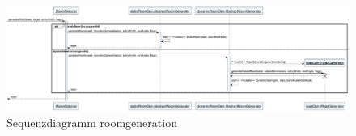 \begin{figure} [htbp]
    \centering
    \centering
    \includegraphics[width=\linewidth]{./Generierung/Bilder/roomGenerationSequenz.png}
    \caption{Sequenzdiagramm roomgeneration}
\end{figure}

